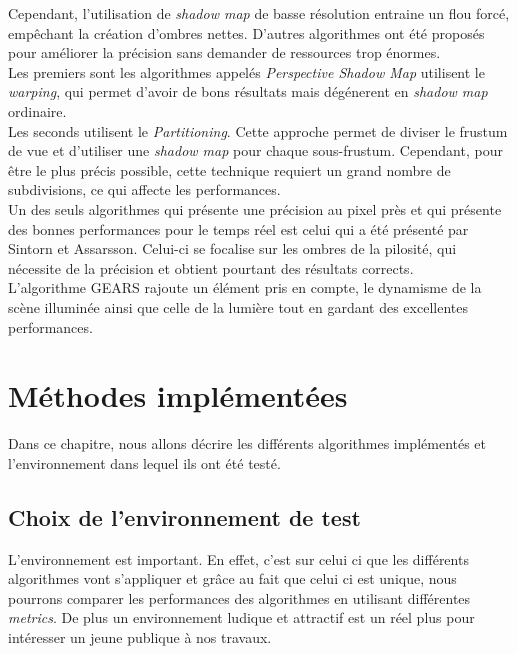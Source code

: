 \documentclass[a4paper,10pt]{report}
\begin{document}
Cependant, l'utilisation de \textit{shadow map} de basse résolution entraine un flou forcé, empêchant la création d'ombres nettes. D'autres algorithmes ont été proposés pour améliorer la précision sans demander de ressources trop énormes. 
\\

Les premiers sont les algorithmes appelés \textit{Perspective Shadow Map}\cite{wimmer2004light,stamminger2002perspective,lloyd2008logarithmic} utilisent le \textit{warping}, qui permet d'avoir de bons résultats mais dégénerent en \textit{shadow map} ordinaire.
\\

Les seconds utilisent le \textit{Partitioning}. Cette approche permet de diviser le frustum de vue et d'utiliser une \textit{shadow map} pour chaque sous-frustum. Cependant, pour être le plus précis possible, cette technique requiert un grand nombre de subdivisions, ce qui affecte les performances.
\\

Un des seuls algorithmes qui présente une précision au pixel près et qui présente des bonnes performances pour le temps réel est celui qui a été présenté par Sintorn et Assarsson\cite{sintorn2009hair}. Celui-ci se focalise sur les ombres de la pilosité, qui nécessite de la précision et obtient pourtant des résultats corrects.
\\

L'algorithme GEARS\cite{wang2014gears} rajoute un élément pris en compte, le dynamisme de la scène illuminée ainsi que celle de la lumière tout en gardant des excellentes performances.


\chapter{Méthodes implémentées}

Dans ce chapitre, nous allons décrire les différents algorithmes implémentés et l'environnement dans lequel ils ont été testé.

\section{Choix de l'environnement de test}

L'environnement est important. En effet, c'est sur celui ci que les différents algorithmes vont s'appliquer et grâce au fait que celui ci est unique, nous pourrons comparer les performances des algorithmes en utilisant différentes \textit{metrics}. De plus un environnement ludique et attractif est un réel plus pour intéresser un jeune publique à nos travaux.
\end{document}
